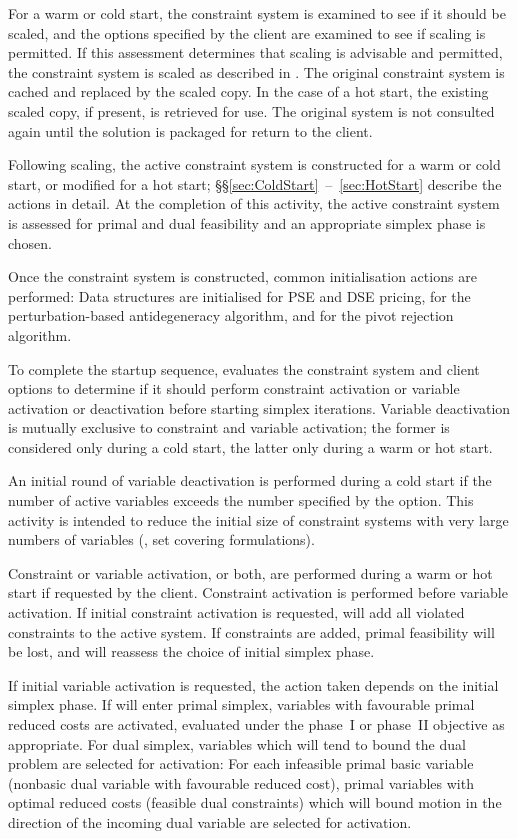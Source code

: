 For a warm or cold start, the constraint system is examined to see if it
should be scaled, and the options specified by the client are examined
to see if scaling is permitted.
If this assessment determines that scaling is advisable and permitted, the
constraint system is scaled as described in .
The original constraint system is cached and replaced by the scaled copy.
In the case of a hot start, the existing scaled copy, if present, is retrieved
for use.
The original system is not consulted again until the solution is packaged for
return to the client.

Following scaling, the active constraint system is constructed for a warm or
cold start, or modified for a hot start;
\S\S\ref{sec:ColdStart}~--~\ref{sec:HotStart} describe the actions in
detail.
At the completion of this activity, the active constraint system is assessed
for primal and dual feasibility and an appropriate simplex phase is chosen.

Once the constraint system is constructed, common initialisation
actions are performed:
Data structures are initialised for PSE and DSE pricing, for the
perturbation-based antidegeneracy algorithm, and for the pivot rejection
algorithm.

To complete the startup sequence, \dylp evaluates the constraint system and
client options to determine if it should perform constraint activation
or variable activation or deactivation before starting simplex iterations.
Variable deactivation is mutually exclusive to constraint and variable
activation; the former is considered only during a cold start, the latter
only during a warm or hot start.

An initial round of variable deactivation is performed during a cold start
if the number of active variables exceeds the number specified
by the  option.
This activity is intended to reduce the initial size of constraint systems
with very large numbers of variables (\eg, set covering formulations).

Constraint or variable activation, or both, are performed during a
warm or hot start if requested by the client.
Constraint activation is performed before variable activation.
If initial constraint activation is requested, \dylp will add all violated
constraints to the active system.
If constraints are added, primal feasibility will be lost, and \dylp will
reassess the choice of initial simplex phase.

If initial variable activation is requested, the action taken depends on the
initial simplex phase.
If \dylp will enter primal simplex, variables with favourable primal reduced
costs are activated, evaluated under the phase~I or phase~II objective as
appropriate.
For dual simplex, variables which will tend to bound the dual problem are
selected for activation:
For each infeasible primal basic variable (nonbasic dual variable with
favourable reduced cost), primal variables with optimal reduced costs
(feasible dual constraints) which will bound motion in the direction of
the incoming dual variable are selected for activation.

